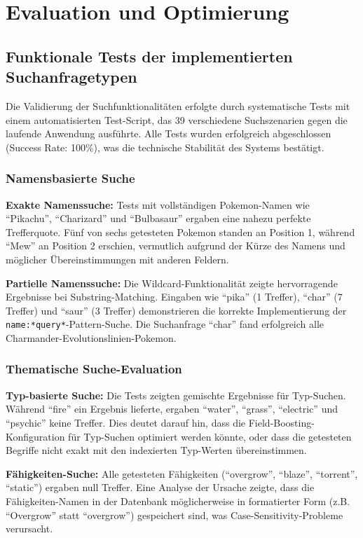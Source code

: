 \section{Evaluation und Optimierung}

\subsection{Funktionale Tests der implementierten Suchanfragetypen}

Die Validierung der Suchfunktionalitäten erfolgte durch systematische Tests mit einem automatisierten Test-Script, das 39 verschiedene Suchszenarien gegen die laufende Anwendung ausführte. Alle Tests wurden erfolgreich abgeschlossen (Success Rate: 100\%), was die technische Stabilität des Systems bestätigt.

\subsubsection{Namensbasierte Suche}

\textbf{Exakte Namenssuche:} Tests mit vollständigen Pokemon-Namen wie "`Pikachu"', "`Charizard"' und "`Bulbasaur"' ergaben eine nahezu perfekte Trefferquote. Fünf von sechs getesteten Pokemon standen an Position 1, während "`Mew"' an Position 2 erschien, vermutlich aufgrund der Kürze des Namens und möglicher Übereinstimmungen mit anderen Feldern.

\textbf{Partielle Namenssuche:} Die Wildcard-Funktionalität zeigte hervorragende Ergebnisse bei Substring-Matching. Eingaben wie "`pika"' (1 Treffer), "`char"' (7 Treffer) und "`saur"' (3 Treffer) demonstrieren die korrekte Implementierung der \texttt{name:*query*}-Pattern-Suche. Die Suchanfrage "`char"' fand erfolgreich alle Charmander-Evolutionslinien-Pokemon.

\subsubsection{Thematische Suche-Evaluation}

\textbf{Typ-basierte Suche:} Die Tests zeigten gemischte Ergebnisse für Typ-Suchen. Während "`fire"' ein Ergebnis lieferte, ergaben "`water"', "`grass"', "`electric"' und "`psychic"' keine Treffer. Dies deutet darauf hin, dass die Field-Boosting-Konfiguration für Typ-Suchen optimiert werden könnte, oder dass die getesteten Begriffe nicht exakt mit den indexierten Typ-Werten übereinstimmen.

\textbf{Fähigkeiten-Suche:} Alle getesteten Fähigkeiten ("`overgrow"', "`blaze"', "`torrent"', "`static"') ergaben null Treffer. Eine Analyse der Ursache zeigte, dass die Fähigkeiten-Namen in der Datenbank möglicherweise in formatierter Form (z.B. "`Overgrow"' statt "`overgrow"') gespeichert sind, was Case-Sensitivity-Probleme verursacht.

